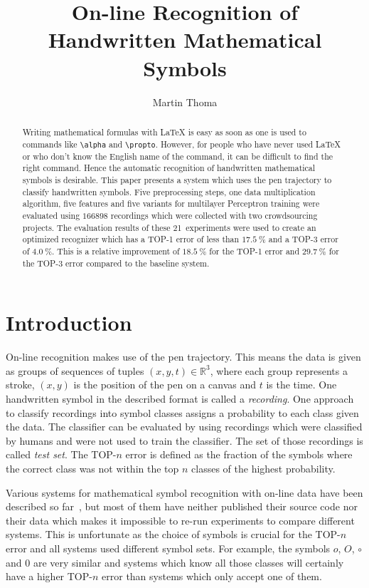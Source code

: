 \documentclass[9pt,technote]{IEEEtran}
\title{On-line Recognition of Handwritten Mathematical Symbols}
\author{Martin Thoma}
\begin{document}
\maketitle
\begin{abstract}
Writing mathematical formulas with \LaTeX{} is easy as soon as one is used to
commands like \verb+\alpha+ and \verb+\propto+. However, for people who have
never used \LaTeX{} or who don't know the English name of the command, it can
be difficult to find the right command. Hence the automatic recognition of
handwritten mathematical symbols is desirable. This paper presents a system
which uses the pen trajectory to classify handwritten symbols. Five
preprocessing steps, one data multiplication algorithm, five features and five
variants for multilayer Perceptron training were evaluated using $\num{166898}$
recordings which were collected with two crowdsourcing projects. The evaluation
results of these 21~experiments were used to create an optimized recognizer
which has a TOP-1 error of less than $\SI{17.5}{\percent}$ and a TOP-3 error of
$\SI{4.0}{\percent}$. This is a relative improvement of $\SI{18.5}{\percent}$ for the
TOP-1 error and $\SI{29.7}{\percent}$ for the TOP-3 error compared to the
baseline system.
\end{abstract}

\section{Introduction}
On-line recognition makes use of the pen trajectory. This means the data is
given as groups of sequences of tuples $(x, y, t) \in \mathbb{R}^3$, where each
group represents a stroke, $(x, y)$ is the position of the pen on a canvas and
$t$ is the time. One handwritten symbol in the described format is called a
\textit{recording}. One approach to classify recordings into symbol classes
assigns a probability to each class given the data. The classifier can be
evaluated by using recordings which were classified by humans and were not used
to train the classifier. The set of those recordings is called \textit{test
set}. The TOP-$n$ error is defined as the fraction of the symbols where
the correct class was not within the top $n$ classes of the highest
probability.

Various systems for mathematical symbol recognition with on-line data have been
described so far~\cite{Kosmala98,Mouchere2013}, but most of them have neither
published their source code nor their data which makes it impossible to re-run
experiments to compare different systems. This is unfortunate as the choice of
symbols is crucial for the TOP-$n$ error and all systems used different symbol
sets. For example, the symbols $o$, $O$, $\circ$ and $0$ are very similar and
systems which know all those classes will certainly have a higher TOP-$n$ error
than systems which only accept one of them.
\end{document}
